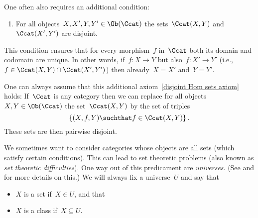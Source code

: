 \begin{remark*}
  \label{disjoint Hom sets}
  One often also requires an additional condition:
  \begin{enumerate}[label=(C\arabic*),start=3]
    \item
      \label{disjoint Hom sets axiom}
      For all objects~$X, X', Y, Y' \in \Ob(\Ccat)$ the sets~$\Ccat(X,Y)$ and~$\Ccat(X',Y')$ are disjoint.
  \end{enumerate}
  This condition ensures that for every morphism~$f$ in~$\Ccat$ both its domain and codomain are unique.
  In other words, if~$f \colon X \to Y$ but also~$f \colon X' \to Y'$ (i.e.,$f \in \Ccat(X,Y) \cap \Ccat(X',Y')$) then already~$X = X'$ and~$Y = Y'$.
  
  One can always assume that this additional axiom~\ref*{disjoint Hom sets axiom} holds:
  If~$\Ccat$ is any category then we can replace for all objects~$X, Y \in \Ob(\Ccat)$ the set~$\Ccat(X,Y)$ by the set of triples
  \[
    \{
      (X,f,Y)
    \suchthat
      f \in \Ccat(X,Y)
    \}  \,.
  \]
  These sets are then pairwise disjoint.
\end{remark*}


\begin{remark}
  We sometimes want to consider categories whose objects are all sets (which satisfy certain conditions).
  This can lead to set theoretic problems (also known as \emph{set theoretic difficulties}).
  One way out of this predicament are \emph{universes}.
  (See \cite[I.6]{Working} and \cite[3.2]{Schubert} for more details on this.)
  We will always fix a universe~$U$ and say that
  \begin{itemize}
    \item
      $X$ is a set if~$X \in U$, and that
    \item
      $X$ is a class if~$X \subseteq U$.
  \end{itemize}
\end{remark}










